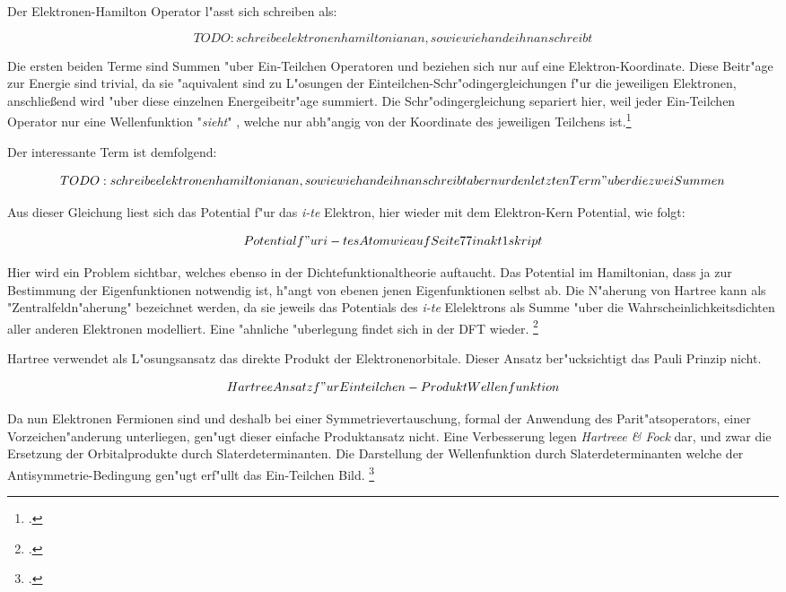 Der Elektronen-Hamilton Operator l"asst sich schreiben als: 

$$TODO: schreibe elektronen hamiltonian an, sowie wie hande ihn anschreibt$$

Die ersten beiden Terme sind Summen "uber Ein-Teilchen Operatoren und beziehen sich nur auf eine Elektron-Koordinate. Diese Beitr"age zur Energie sind trivial, da sie  "aquivalent sind zu L"osungen der  Einteilchen-Schr"odingergleichungen f"ur die jeweiligen Elektronen, anschließend wird "uber diese einzelnen Energeibeitr"age summiert.  Die Schr"odingergleichung separiert hier, weil jeder Ein-Teilchen Operator nur eine Wellenfunktion "\textit{sieht}" , welche nur abh"angig von der Koordinate des jeweiligen Teilchens ist.\footcite[Lecture 4][1]{hande}

Der interessante Term ist demfolgend:

$$TODO: schreibe elektronen hamiltonian an, sowie wie hande ihn anschreibt aber nur den letzten Term "uber die zwei Summen $$

Aus dieser Gleichung liest sich das Potential f"ur das \textit{i-te} Elektron, hier wieder mit dem Elektron-Kern Potential, wie folgt:

$$Potential f"ur i-tes Atom wie auf Seite 77 in akt1 skript$$

Hier wird ein Problem sichtbar, welches ebenso in der Dichtefunktionaltheorie auftaucht. Das Potential im Hamiltonian, dass ja zur Bestimmung der Eigenfunktionen notwendig ist, h"angt von ebenen jenen Eigenfunktionen selbst ab. Die N"aherung von Hartree kann als "Zentralfeldn"aherung" bezeichnet werden, da sie jeweils das  Potentials des  \textit{i-te} Elelektrons als Summe "uber die Wahrscheinlichkeitsdichten aller anderen Elektronen modelliert. Eine "ahnliche "uberlegung findet sich in der DFT wieder. \footcite[78]{akt1}



Hartree verwendet als L"osungsansatz das direkte Produkt der Elektronenorbitale. Dieser Ansatz ber"ucksichtigt das Pauli Prinzip nicht.

$$ Hartree Ansatz f"ur Einteilchen-Produkt Wellenfunktion$$

Da nun Elektronen Fermionen sind und deshalb bei einer Symmetrievertauschung, formal der Anwendung des Parit"atsoperators, einer Vorzeichen"anderung unterliegen, gen"ugt dieser einfache Produktansatz nicht. Eine Verbesserung legen \textit{Hartreee \& Fock} dar, und zwar die Ersetzung der Orbitalprodukte durch Slaterdeterminanten. Die Darstellung der Wellenfunktion durch Slaterdeterminanten welche der Antisymmetrie-Bedingung  gen"ugt erf"ullt das Ein-Teilchen Bild.  \footcite[Lecture 4][2]{hande}


